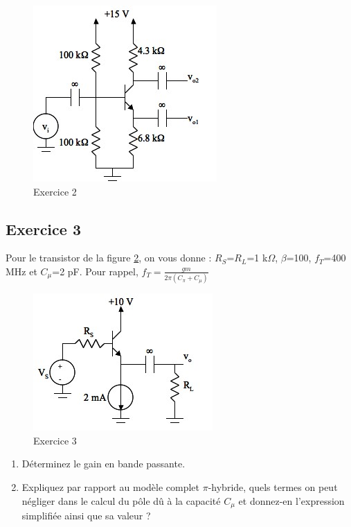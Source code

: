 \documentclass[paper=a4, fontsize=11pt]{article} %
\numberwithin{equation}{section} %
\numberwithin{figure}{section} %
\numberwithin{table}{section} %
\begin{document}
\begin{figure}[!htbp]
   \centering
   \includegraphics[]{figure/fig5-2.png}
   \caption{Exercice 2}
   \label{fig5-2}
\end{figure}

\newpage
\subsection*{Exercice 3}
Pour le transistor de la figure \ref{fig5-3}, on vous donne : $R_S$=$R_L$=1 k$\Omega$, $\beta$=100, $f_T$=400 MHz et $C_\mu$=2 pF. Pour rappel, $f_T=\frac{gm}{2\pi(C_\pi+C_\mu)}$

\begin{figure}[!htbp]
   \centering
   \includegraphics[]{figure/fig5-3.png}
   \caption{Exercice 3}
   \label{fig5-3}
\end{figure}

\begin{enumerate}
\item Déterminez le gain en bande passante.
\item Expliquez par rapport au modèle complet $\pi$-hybride, quels termes on peut négliger dans le calcul du pôle dû à la capacité $C_\mu$ et donnez-en l'expression simplifiée ainsi que sa valeur ?
\end{enumerate}
\end{document}
